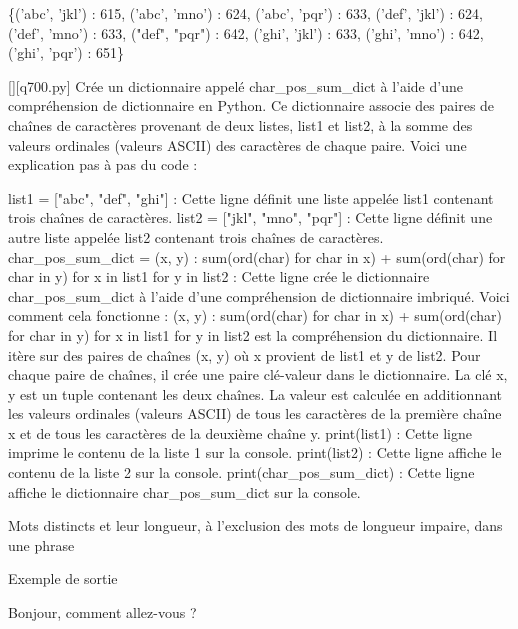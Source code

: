 \{('abc', 'jkl') : 615, ('abc', 'mno') : 624, ('abc', 'pqr') : 633, ('def', 'jkl') : 624, ('def', 'mno') : 633, ("def", "pqr") : 642, ('ghi', 'jkl') : 633, ('ghi', 'mno') : 642, ('ghi', 'pqr') : 651\}
        \par
        \begin{solution}
            \renewcommand{\nomfichier}{q700.py}
            \pythonfile{\chemincode \nomfichier}[][\nomfichier]
            Crée un dictionnaire appelé char_pos_sum_dict à l'aide d'une compréhension de dictionnaire en Python. Ce dictionnaire associe des paires de chaînes de caractères provenant de deux listes, list1 et list2, à la somme des valeurs ordinales (valeurs ASCII) des caractères de chaque paire. Voici une explication pas à pas du code :

    list1 = ["abc", "def", "ghi"] : Cette ligne définit une liste appelée list1 contenant trois chaînes de caractères.
    list2 = ["jkl", "mno", "pqr"] : Cette ligne définit une autre liste appelée list2 contenant trois chaînes de caractères.
    char_pos_sum_dict = {(x, y) : sum(ord(char) for char in x) + sum(ord(char) for char in y) for x in list1 for y in list2} : Cette ligne crée le dictionnaire char_pos_sum_dict à l'aide d'une compréhension de dictionnaire imbriqué. Voici comment cela fonctionne :
        {(x, y) : sum(ord(char) for char in x) + sum(ord(char) for char in y) for x in list1 for y in list2} est la compréhension du dictionnaire. Il itère sur des paires de chaînes (x, y) où x provient de list1 et y de list2.
        Pour chaque paire de chaînes, il crée une paire clé-valeur dans le dictionnaire. La clé x, y est un tuple contenant les deux chaînes. La valeur est calculée en additionnant les valeurs ordinales (valeurs ASCII) de tous les caractères de la première chaîne x et de tous les caractères de la deuxième chaîne y.
    print(list1) : Cette ligne imprime le contenu de la liste 1 sur la console.
    print(list2) : Cette ligne affiche le contenu de la liste 2 sur la console.
    print(char_pos_sum_dict) : Cette ligne affiche le dictionnaire char_pos_sum_dict sur la console.
        \end{solution}
        

        \question
        Mots distincts et leur longueur, à l'exclusion des mots de longueur impaire, dans une phrase

Exemple de sortie

Bonjour, comment allez-vous ?

